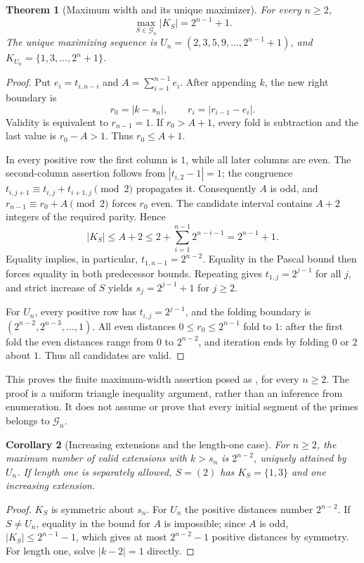 \documentclass[11pt,a4paper]{article}
\newtheorem{theorem}{Theorem}[section]
\newtheorem{corollary}[theorem]{Corollary}
\theoremstyle{definition}
\theoremstyle{remark}
\numberwithin{equation}{section}
\begin{document}
\begin{theorem}[Maximum width and its unique maximizer]\label{A:thm:gilbreath-max}
For every $n\ge2$,
\[
 \max_{S\in\mathcal G_n}|K_S|=2^{n-1}+1.
\]
The unique maximizing sequence is
$U_n=(2,3,5,9,\ldots,2^{n-1}+1)$, and
$K_{U_n}=\{1,3,\ldots,2^n+1\}$.
\end{theorem}
\begin{proof}
Put $e_i=t_{i,n-i}$ and $A=\sum_{i=1}^{n-1}e_i$. After appending $k$,
the new right boundary is
\[
 r_0=|k-s_n|,\qquad r_i=|r_{i-1}-e_i|.
\]
Validity is equivalent to $r_{n-1}=1$. If $r_0>A+1$, every fold is
subtraction and the last value is $r_0-A>1$. Thus $r_0\le A+1$.

In every positive row the first column is $1$, while all later columns
are even. The second-column assertion follows from $|t_{i,2}-1|=1$;
the congruence $t_{i,j+1}\equiv t_{i,j}+t_{i+1,j}\pmod2$ propagates it.
Consequently $A$ is odd, and
$r_{n-1}\equiv r_0+A\pmod2$ forces $r_0$ even. The candidate interval
contains $A+2$ integers of the required parity. Hence
\[
 |K_S|\le A+2\le2+\sum_{i=1}^{n-1}2^{n-i-1}=2^{n-1}+1.
\]
Equality implies, in particular, $t_{1,n-1}=2^{n-2}$. Equality in
the Pascal bound then forces equality in both predecessor bounds.
Repeating gives $t_{1,j}=2^{j-1}$ for all $j$, and strict increase of
$S$ yields $s_j=2^{j-1}+1$ for $j\ge2$.

For $U_n$, every positive row has $t_{i,j}=2^{j-1}$, and the folding
boundary is $(2^{n-2},2^{n-3},\ldots,1)$. All even distances
$0\le r_0\le2^{n-1}$ fold to $1$: after the first fold the even
distances range from $0$ to $2^{n-2}$, and iteration ends by folding
$0$ or $2$ about $1$. Thus all candidates are valid.
\end{proof}

This proves the finite maximum-width assertion posed as
\cite[Conjecture 30]{R003}, for every $n\ge2$. The proof is a uniform
triangle inequality argument, rather than an inference from enumeration.
It does not assume or prove that every initial segment of the primes
belongs to $\mathcal G_n$.

\begin{corollary}[Increasing extensions and the length-one case]
For $n\ge2$, the maximum number of valid extensions with $k>s_n$ is
$2^{n-2}$, uniquely attained by $U_n$. If length one is separately
allowed, $S=(2)$ has $K_S=\{1,3\}$ and one increasing extension.
\end{corollary}
\begin{proof}
$K_S$ is symmetric about $s_n$. For $U_n$ the positive distances
number $2^{n-2}$. If $S\ne U_n$, equality in the bound for $A$ is
impossible; since $A$ is odd, $|K_S|\le2^{n-1}-1$, which gives at
most $2^{n-2}-1$ positive distances by symmetry. For length one,
solve $|k-2|=1$ directly.
\end{proof}
\end{document}
